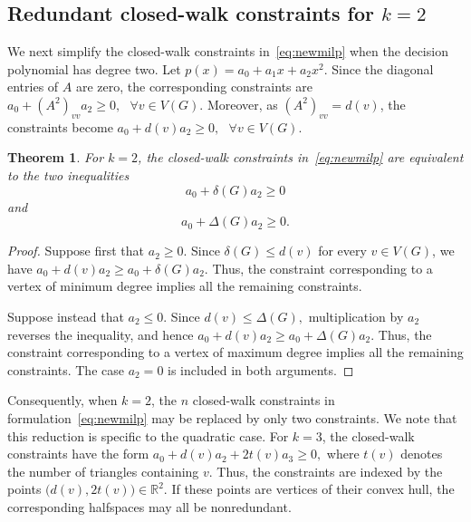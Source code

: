 \documentclass[10pt]{article}
\newtheorem{theorem}{Theorem}[section]
\begin{document}
\subsection{Redundant closed-walk constraints for \(k=2\)}
\label{subsec:redundant-constraints}

We next simplify the closed-walk constraints in~\eqref{eq:newmilp} when the
decision polynomial has degree two. Let \(p(x)=a_0+a_1x+a_2x^2.\)
Since the diagonal entries of \(A\) are zero, the corresponding constraints
are \(a_0+(A^2)_{vv}a_2\geq0, \text{ } \forall v\in V(G).\)
Moreover, as \((A^2)_{vv}=d(v)\), the constraints become
\(a_0+d(v)a_2\geq0, \text{ } \forall v\in V(G).\)

\begin{theorem}
\label{thm:redundant-degree-two}
For \(k=2\), the closed-walk constraints in~\eqref{eq:newmilp} are equivalent
to the two inequalities
\[
    a_0+\delta(G)a_2\geq0
\]
and
\[
    a_0+\Delta(G)a_2\geq0.
\]
\end{theorem}

\begin{proof}
Suppose first that \(a_2\geq0\). Since \(\delta(G)\leq d(v)\) for every \(v\in V(G)\), we have
\(
    a_0+d(v)a_2
    \geq
    a_0+\delta(G)a_2.
\)
Thus, the constraint corresponding to a vertex of minimum degree implies all
the remaining constraints.

Suppose instead that \(a_2\leq0\). Since \(d(v)\leq\Delta(G),\)
multiplication by \(a_2\) reverses the inequality, and hence
\(
    a_0+d(v)a_2
    \geq
    a_0+\Delta(G)a_2.
\)
Thus, the constraint corresponding to a vertex of maximum degree implies all
the remaining constraints. The case \(a_2=0\) is included in both arguments.
\end{proof}

Consequently, when \(k=2\), the \(n\) closed-walk constraints in
formulation~\eqref{eq:newmilp} may be replaced by only two constraints. We note that this reduction is specific to the quadratic case. For \(k=3\), the
closed-walk constraints have the form
\(
    a_0+d(v)a_2+2t(v)a_3\geq0,
\)
where \(t(v)\) denotes the number of triangles containing \(v\). Thus, the
constraints are indexed by the points
\(
    \bigl(d(v),2t(v)\bigr)\in\mathbb{R}^2.
\)
If these points are vertices of their convex hull, the corresponding
halfspaces may all be nonredundant.
\end{document}
